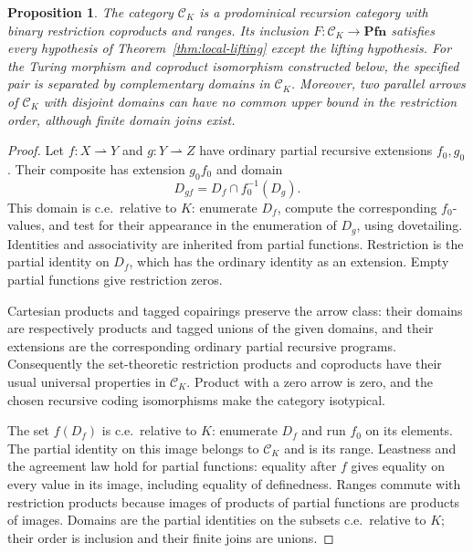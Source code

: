 \documentclass[11pt]{article}
\newtheorem{proposition}[theorem]{Proposition}
\newcommand{\Pfn}{\mathbf{Pfn}}
\begin{document}
\begin{proposition}\label{prop:missing-lift}
The category $\mathcal C_K$ is a prodominical recursion category with
binary restriction coproducts and ranges. Its inclusion
$F:\mathcal C_K\to\Pfn$ satisfies every hypothesis of
Theorem~\ref{thm:local-lifting} except the lifting hypothesis.
For the Turing morphism and coproduct isomorphism constructed below,
the specified pair is separated by complementary domains in
$\mathcal C_K$. Moreover, two parallel arrows of $\mathcal C_K$
with disjoint domains can have no common upper bound in the
restriction order, although finite domain joins exist.
\end{proposition}

\begin{proof}
Let $f:X\rightharpoonup Y$ and $g:Y\rightharpoonup Z$ have
ordinary partial recursive extensions $f_0,g_0$. Their composite has
extension $g_0f_0$ and domain
\[
 D_{gf}=D_f\cap f_0^{-1}(D_g).
\]
This domain is c.e.\ relative to $K$: enumerate $D_f$, compute the
corresponding $f_0$-values, and test for their appearance in the
enumeration of $D_g$, using dovetailing. Identities and associativity
are inherited from partial functions. Restriction is the partial
identity on $D_f$, which has the ordinary identity as an extension.
Empty partial functions give restriction zeros.

Cartesian products and tagged copairings preserve the arrow class:
their domains are respectively products and tagged unions of the given
domains, and their extensions are the corresponding ordinary partial
recursive programs. Consequently the set-theoretic restriction
products and coproducts have their usual universal properties in
$\mathcal C_K$. Product with a zero arrow is zero, and the chosen
recursive coding isomorphisms make the category isotypical.

The set $f(D_f)$ is c.e.\ relative to $K$: enumerate $D_f$ and run
$f_0$ on its elements. The partial identity on this image belongs to
$\mathcal C_K$ and is its range. Leastness and the agreement law
hold for partial functions: equality after $f$ gives equality on
every value in its image, including equality of definedness.
Ranges commute with restriction products because images of products
of partial functions are products of images. Domains are the partial
identities on the subsets c.e.\ relative to $K$; their order is
inclusion and their finite joins are unions.


\end{proof}
\end{document}
